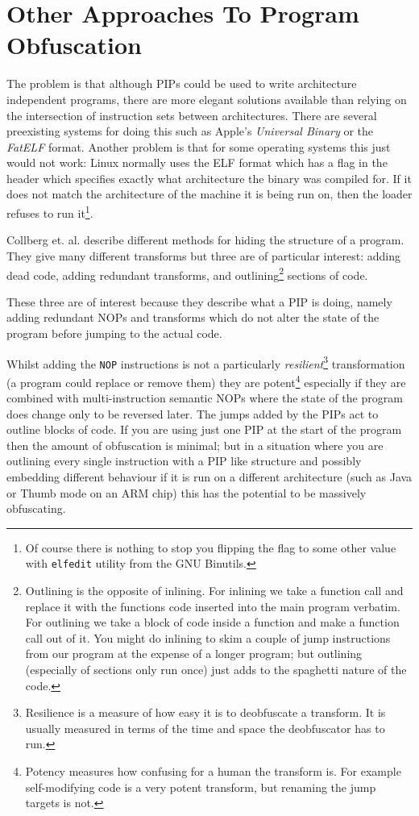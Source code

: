 \documentclass[10pt]{book}
\begin{document}
\section{Other Approaches To Program Obfuscation}

The problem is that although PIPs could be used to write architecture
independent programs, there are more elegant solutions available than
relying on the intersection of instruction sets between architectures.
There are several preexisting systems for doing this such as Apple's
\emph{Universal Binary} or the \emph{FatELF}\autocite{Icculus:vl}
format. Another problem is that for some operating systems this just
would not work: Linux normally uses the ELF format\autocite{mancx:th}
which has a flag in the header which specifies exactly what architecture
the binary was compiled for. If it does not match the architecture of
the machine it is being run on, then the loader refuses to run
it\footnote{Of course there is nothing to stop you flipping the flag to
  some other value with \lstinline!elfedit! utility from the GNU
  Binutils.}.

Collberg et. al. \autocite{Collberg:1997vt} describe different methods
for hiding the structure of a program. They give many different
transforms but three are of particular interest: adding dead code,
adding redundant transforms, and outlining\footnote{Outlining is the
  opposite of inlining. For inlining we take a function call and replace
  it with the functions code inserted into the main program verbatim.
  For outlining we take a block of code inside a function and make a
  function call out of it. You might do inlining to skim a couple of
  jump instructions from our program at the expense of a longer program;
  but outlining (especially of sections only run once) just adds to the
  spaghetti nature of the code.} sections of code.

These three are of interest because they describe what a PIP is doing,
namely adding redundant NOPs and transforms which do not alter the state
of the program before jumping to the actual code.

Whilst adding the \lstinline!NOP! instructions is not a particularly
\emph{resilient}\footnote{Resilience is a measure of how easy it is to
  deobfuscate a transform. It is usually measured in terms of the time
  and space the deobfuscator has to run.} transformation (a program
could replace or remove them) they are potent\footnote{Potency measures
  how confusing for a human the transform is. For example self-modifying
  code is a very potent transform, but renaming the jump targets is not.}
especially if they are combined with multi-instruction semantic NOPs
where the state of the program does change only to be reversed later.
The jumps added by the PIPs act to outline blocks of code. If you are
using just one PIP at the start of the program then the amount of
obfuscation is minimal; but in a situation where you are outlining every
single instruction with a PIP like structure and possibly embedding
different behaviour if it is run on a different architecture (such as
Java or Thumb mode on an ARM chip) this has the potential to be
massively obfuscating.
\end{document}
